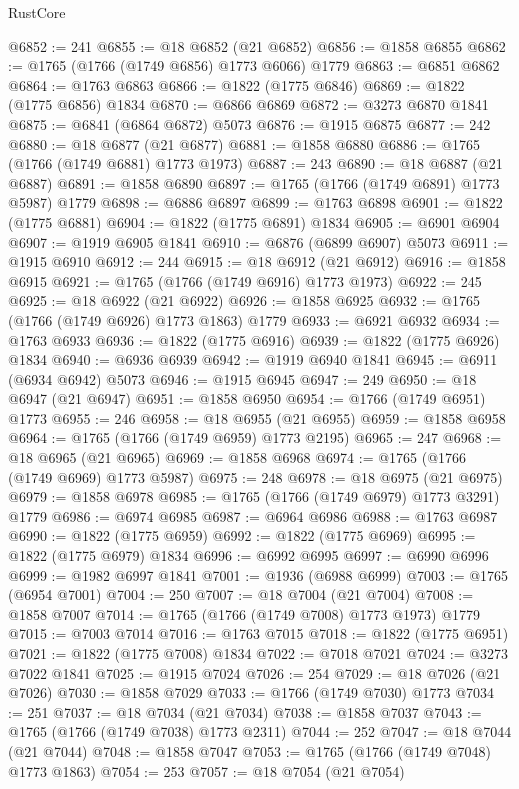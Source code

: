 \begin{lexlean}{RustCore}
\begin{coremodule}
@6852 := 241
@6855 := @18 @6852 (@21 @6852)
@6856 := @1858 @6855
@6862 := @1765 (@1766 (@1749 @6856) @1773 @6066) @1779
@6863 := @6851 @6862
@6864 := @1763 @6863
@6866 := @1822 (@1775 @6846)
@6869 := @1822 (@1775 @6856) @1834
@6870 := @6866 @6869
@6872 := @3273 @6870 @1841
@6875 := @6841 (@6864 @6872) @5073
@6876 := @1915 @6875
@6877 := 242
@6880 := @18 @6877 (@21 @6877)
@6881 := @1858 @6880
@6886 := @1765 (@1766 (@1749 @6881) @1773 @1973)
@6887 := 243
@6890 := @18 @6887 (@21 @6887)
@6891 := @1858 @6890
@6897 := @1765 (@1766 (@1749 @6891) @1773 @5987) @1779
@6898 := @6886 @6897
@6899 := @1763 @6898
@6901 := @1822 (@1775 @6881)
@6904 := @1822 (@1775 @6891) @1834
@6905 := @6901 @6904
@6907 := @1919 @6905 @1841
@6910 := @6876 (@6899 @6907) @5073
@6911 := @1915 @6910
@6912 := 244
@6915 := @18 @6912 (@21 @6912)
@6916 := @1858 @6915
@6921 := @1765 (@1766 (@1749 @6916) @1773 @1973)
@6922 := 245
@6925 := @18 @6922 (@21 @6922)
@6926 := @1858 @6925
@6932 := @1765 (@1766 (@1749 @6926) @1773 @1863) @1779
@6933 := @6921 @6932
@6934 := @1763 @6933
@6936 := @1822 (@1775 @6916)
@6939 := @1822 (@1775 @6926) @1834
@6940 := @6936 @6939
@6942 := @1919 @6940 @1841
@6945 := @6911 (@6934 @6942) @5073
@6946 := @1915 @6945
@6947 := 249
@6950 := @18 @6947 (@21 @6947)
@6951 := @1858 @6950
@6954 := @1766 (@1749 @6951) @1773
@6955 := 246
@6958 := @18 @6955 (@21 @6955)
@6959 := @1858 @6958
@6964 := @1765 (@1766 (@1749 @6959) @1773 @2195)
@6965 := 247
@6968 := @18 @6965 (@21 @6965)
@6969 := @1858 @6968
@6974 := @1765 (@1766 (@1749 @6969) @1773 @5987)
@6975 := 248
@6978 := @18 @6975 (@21 @6975)
@6979 := @1858 @6978
@6985 := @1765 (@1766 (@1749 @6979) @1773 @3291) @1779
@6986 := @6974 @6985
@6987 := @6964 @6986
@6988 := @1763 @6987
@6990 := @1822 (@1775 @6959)
@6992 := @1822 (@1775 @6969)
@6995 := @1822 (@1775 @6979) @1834
@6996 := @6992 @6995
@6997 := @6990 @6996
@6999 := @1982 @6997 @1841
@7001 := @1936 (@6988 @6999)
@7003 := @1765 (@6954 @7001)
@7004 := 250
@7007 := @18 @7004 (@21 @7004)
@7008 := @1858 @7007
@7014 := @1765 (@1766 (@1749 @7008) @1773 @1973) @1779
@7015 := @7003 @7014
@7016 := @1763 @7015
@7018 := @1822 (@1775 @6951)
@7021 := @1822 (@1775 @7008) @1834
@7022 := @7018 @7021
@7024 := @3273 @7022 @1841
@7025 := @1915 @7024
@7026 := 254
@7029 := @18 @7026 (@21 @7026)
@7030 := @1858 @7029
@7033 := @1766 (@1749 @7030) @1773
@7034 := 251
@7037 := @18 @7034 (@21 @7034)
@7038 := @1858 @7037
@7043 := @1765 (@1766 (@1749 @7038) @1773 @2311)
@7044 := 252
@7047 := @18 @7044 (@21 @7044)
@7048 := @1858 @7047
@7053 := @1765 (@1766 (@1749 @7048) @1773 @1863)
@7054 := 253
@7057 := @18 @7054 (@21 @7054)

\end{coremodule}
\end{lexlean}
